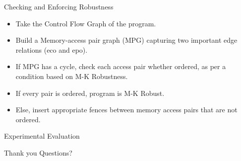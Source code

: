 \documentclass[notes, xcolor=dvipsnames]{beamer}
\begin{document}
    \begin{frame}{Checking and Enforcing Robustness}

        \begin{itemize}
            \item Take the Control Flow Graph of the program.
            \item Build a Memory-access pair graph (MPG) capturing two important edge relations (eco and epo).
            \item If MPG has a cycle, check each access pair whether ordered, as per a condition based on M-K Robustness.
            \item If every pair is ordered, program is M-K Robust.
            \item Else, insert appropriate fences between memory access pairs that are not ordered. 
        \end{itemize}

    \end{frame}

    \begin{frame}{Experimental Evaluation}

    \end{frame}

    \begin{frame}{Thank you}
        Questions?
    \end{frame}
\end{document}
